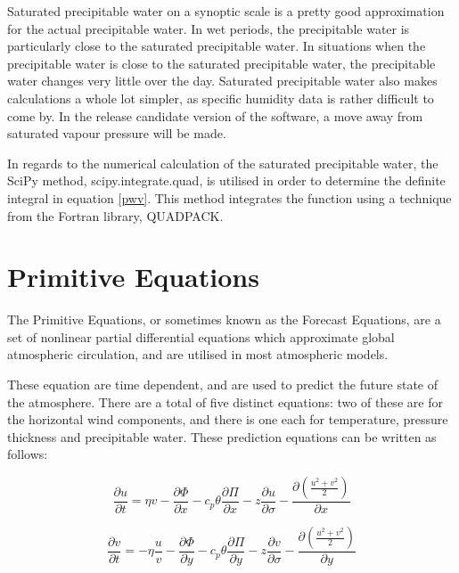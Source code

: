 Saturated precipitable water on a synoptic scale is a pretty good approximation for the actual precipitable water. In wet periods, the precipitable water is particularly close to the saturated precipitable water. In situations when the precipitable water is close to the saturated precipitable water, the precipitable water changes very little over the day. Saturated precipitable water also makes calculations a whole lot simpler, as specific humidity data is rather difficult to come by. In the release candidate version of the software, a move away from saturated vapour pressure will be made\cite{pwv_error}.

In regards to the numerical calculation of the saturated precipitable water, the SciPy method, scipy.integrate.quad, is utilised in order to determine the definite integral in equation \ref{pwv}. This method integrates the function using a technique from the Fortran library, QUADPACK\cite{scipy_integrate}. 

\section{Primitive Equations}
\begin{definition}
The Primitive Equations, or sometimes known as the Forecast Equations, are a set of nonlinear partial differential equations which approximate global atmospheric circulation, and are utilised in most atmospheric models. 
\end{definition}

These equation are time dependent, and are used to predict the future state of the atmosphere. There are a total of five distinct equations: two of these are for the horizontal wind components, and there is one each for temperature, pressure thickness and precipitable water\cite{nws}. These prediction equations can be written as follows: 

\begin{equation}
    \frac{\partial u}{\partial t} = \eta v - \frac{\partial \Phi}{\partial x} - c_{p} \theta \frac{\partial \Pi}{\partial x} - z \frac{\partial u}{\partial \sigma} - \frac{\partial (\frac{u^2 + v^2}{2})}{\partial x}
    \label{prim_u}
\end{equation}

\begin{equation}
    \frac{\partial v}{\partial t} = - \eta \frac{u}{v} - \frac{\partial \Phi}{\partial y} - c_{p} \theta \frac{\partial \Pi}{\partial y} - z \frac{\partial v}{\partial \sigma} - \frac{\partial (\frac{u^2 + v^2}{2})}{\partial y}
    \label{prim_v}
\end{equation}


